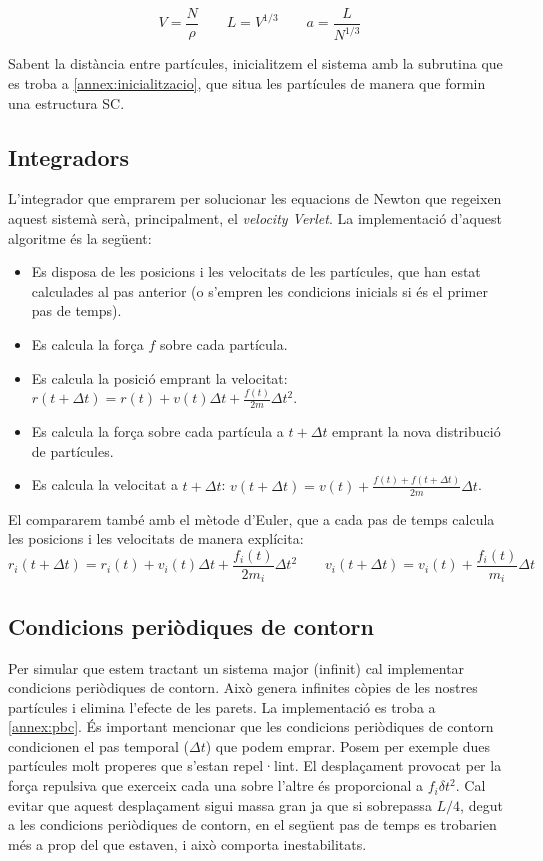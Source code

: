 \documentclass[a4paper,10pt]{article}
\begin{document}
$$ V = \frac{N}{\rho} \qquad L = V^{1/3} \qquad a = \frac{L}{N^{1/3}} $$

Sabent la distància entre partícules, inicialitzem el sistema amb la subrutina que es troba a \ref{annex:inicialitzacio}, que situa les partícules de manera que formin una estructura SC.

\subsection{Integradors}
L'integrador que emprarem per solucionar les equacions de Newton que regeixen aquest sistemà serà, principalment, el \textit{velocity Verlet}. La implementació d'aquest algoritme és la següent:

\begin{itemize}
	\item Es disposa de les posicions i les velocitats de les partícules, que han estat calculades al pas anterior (o s'empren les condicions inicials si és el primer pas de temps).
	\item Es calcula la força $f$ sobre cada partícula.
	\item Es calcula la posició emprant la velocitat: $r (t + \Delta t) = r(t) + v(t) \Delta t + \frac{f(t)}{2m}\Delta t ^2$.
	\item Es calcula  la força sobre cada partícula a $t + \Delta t$ emprant la nova distribució de partícules. 
	
	\item Es calcula la velocitat a $t + \Delta t$: $v(t+\Delta t) = v(t) + \frac{f(t) + f(t + \Delta t)}{2m} \Delta t$.

\end{itemize}

El compararem també amb el mètode d'Euler, que a cada pas de temps calcula les posicions i les velocitats de manera explícita:
\begin{equation}
	r_i (t+\Delta t) = r_i(t) + v_i(t) \Delta t + \frac{f_i(t)}{2m_i}\Delta t^2 \qquad v_i (t + \Delta t) = v_i (t) + \frac{f_i(t)}{m_i} \Delta t
\end{equation}

\subsection{Condicions periòdiques de contorn}
Per simular que estem tractant un sistema major (infinit) cal implementar condicions periòdiques de contorn. Això genera infinites còpies de les nostres partícules i elimina l'efecte de les parets. La implementació es troba a \ref{annex:pbc}. És important mencionar que les condicions periòdiques de contorn condicionen el pas temporal ($\Delta t$) que podem emprar. Posem per exemple dues partícules molt properes que s'estan repel·lint. El desplaçament provocat per la força repulsiva que exerceix cada una sobre l'altre és proporcional a $f_i \delta t^2$. Cal evitar que aquest desplaçament sigui massa gran ja que si  sobrepassa $L/4$, degut a les condicions periòdiques de contorn, en el següent pas de temps es trobarien més a prop del que estaven, i això comporta inestabilitats.
\end{document}
